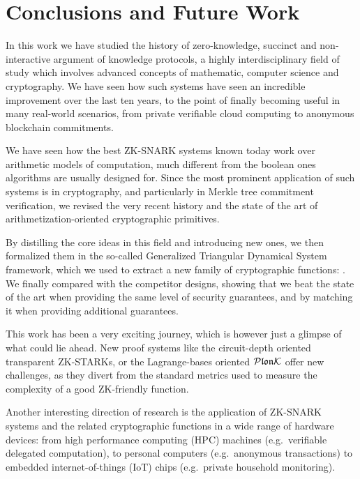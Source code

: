 \chapter{Conclusions and Future Work}\label{chap:conclusions}
In this work we have studied the history of zero-knowledge, succinct and non-interactive 
argument of knowledge protocols, a highly interdisciplinary field of study which involves advanced
concepts of mathematic, computer science and cryptography.
We have seen how such systems have seen an incredible improvement over the last ten years, to the 
point of finally becoming useful in many real-world scenarios, from private verifiable cloud 
computing to anonymous blockchain commitments.

We have seen how the best ZK-SNARK systems known today work over arithmetic models of 
computation, much different from the boolean ones algorithms are usually designed for.
Since the most prominent application of such systems is in cryptography, and particularly in 
Merkle tree commitment verification, we revised the very recent history and the state of the art of 
arithmetization-oriented cryptographic primitives.

By distilling the core ideas in this field and introducing new ones, we then formalized them in the 
so-called Generalized Triangular Dynamical System framework, which we used to extract a new family 
of cryptographic functions: \Arion{}.
We finally compared \Arion{} with the competitor designs, showing that we beat the state of the 
art when providing the same level of security guarantees, and by matching it when providing 
additional guarantees.

This work has been a very exciting journey, which is however just a glimpse of what could lie ahead.
New proof systems like the circuit-depth oriented transparent ZK-STARKs, or the Lagrange-bases 
oriented \(\mathcal{P}\mathfrak{lon}\mathcal{K} \) offer new challenges, as they divert from the standard metrics used to measure 
the complexity of a good ZK-friendly function. 

Another interesting direction of research is the application of ZK-SNARK systems and the 
related cryptographic functions in a wide range of hardware devices: from high performance 
computing (HPC) machines (e.g.\ verifiable delegated computation), to personal computers 
(e.g.\ anonymous transactions) to embedded internet-of-things (IoT) chips 
(e.g.\ private household monitoring). 
